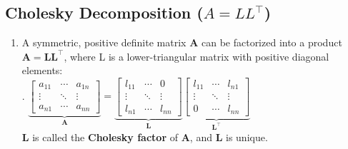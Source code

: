 \subsection{Cholesky Decomposition ($A=LL^\top$)}

\begin{enumerate}
    \item
    \begin{theorem}
        A symmetric, positive definite matrix $\bm{A}$ can be factorized into a product $\bm{A} = \bm{LL}^\top$, where L is a lower-triangular matrix with positive diagonal elements:
        \hfill \cite{mfml/book/mml/Deisenroth-Faisal-Ong}
        \\
        .\hfill
        $
            \underset
            {
                \displaystyle
                \bm{A}
            }
            {\underbrace{
                \displaystyle
                \begin{bmatrix}
                    a_{11} & \cdots & a_{1n} \\
                    \vdots & \ddots & \vdots \\
                    a_{n1} & \cdots & a_{nn}
                \end{bmatrix}
            }}
            =
            \underset
            {
                \displaystyle
                \bm{L}
            }
            {\underbrace{
                \displaystyle
                \begin{bmatrix}
                    l_{11} & \cdots & 0 \\
                    \vdots & \ddots & \vdots \\
                    l_{n1} & \cdots & l_{nn}
                \end{bmatrix}
            }}
            \underset
            {
                \displaystyle
                \bm{L}^\top
            }
            {\underbrace{
                \displaystyle
                \begin{bmatrix}
                    l_{11} & \cdots & l_{n1} \\
                    \vdots & \ddots & \vdots \\
                    0 & \cdots & l_{nn}
                \end{bmatrix}
            }}
        $
        \hfill \cite{mfml/book/mml/Deisenroth-Faisal-Ong}
        \\
        $\bm{L}$ is called the \textbf{Cholesky factor} of $\bm{A}$, and $\bm{L}$ is unique.
        \hfill \cite{mfml/book/mml/Deisenroth-Faisal-Ong}
    \end{theorem}


\end{enumerate}
